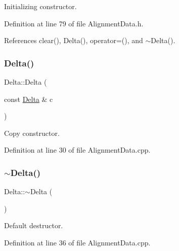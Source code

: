 Initializing constructor. 



Definition at line 79 of file Alignment\+Data.\+h.



References clear(), Delta(), operator=(), and $\sim$\+Delta().

\hypertarget{class_d_d4hep_1_1_alignments_1_1_delta_a3fcd404a6a78a214f1c655a07d3db46d}{}\label{class_d_d4hep_1_1_alignments_1_1_delta_a3fcd404a6a78a214f1c655a07d3db46d} 
\subsubsection{\texorpdfstring{Delta()}{Delta()}\hspace{0.1cm}{\footnotesize\ttfamily [7/7]}}
{\footnotesize\ttfamily Delta\+::\+Delta (\begin{DoxyParamCaption}\item[{const \hyperlink{class_d_d4hep_1_1_alignments_1_1_delta}{Delta} \&}]{c }\end{DoxyParamCaption})}



Copy constructor. 



Definition at line 30 of file Alignment\+Data.\+cpp.

\hypertarget{class_d_d4hep_1_1_alignments_1_1_delta_a7eff633a0f57a904c8a125178e9ba3b8}{}\label{class_d_d4hep_1_1_alignments_1_1_delta_a7eff633a0f57a904c8a125178e9ba3b8} 
\subsubsection{\texorpdfstring{$\sim$\+Delta()}{~Delta()}}
{\footnotesize\ttfamily Delta\+::$\sim$\+Delta (\begin{DoxyParamCaption}{ }\end{DoxyParamCaption})}



Default destructor. 



Definition at line 36 of file Alignment\+Data.\+cpp.



